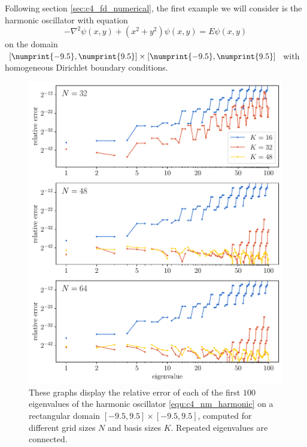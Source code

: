 Following section \ref{sec:c4_fd_numerical}, the first example we will consider is the harmonic oscillator with equation
\begin{equation}\label{equ:c4_nm_harmonic}
    -\nabla^2 \psi(x, y) + \left(x^2 + y^2\right) \psi(x, y) = E \psi(x, y)
\end{equation}
on the domain $[\numprint{-9.5}, \numprint{9.5}] \times [\numprint{-9.5}, \numprint{9.5}]$ with homogeneous Dirichlet boundary conditions.

\begin{figure}
    \begin{center}
        \includegraphics[width=\textwidth]{img/chapter4/nm_test_harmonic.pdf}
    \end{center}
    \caption{These graphs display the relative error of each of the first $100$ eigenvalues of the harmonic oscillator \eqref{equ:c4_nm_harmonic} on a rectangular domain $[-9.5,9.5]\times[-9.5, 9.5]$, computed for different grid sizes $N$ and basis sizes $K$. Repeated eigenvalues are connected.}
    \label{fig:c4_nm_harmonic_rectangle}
\end{figure}

